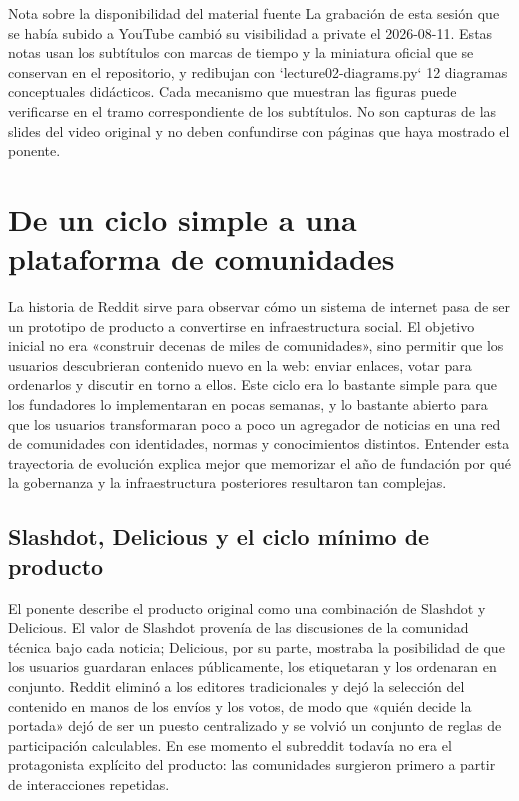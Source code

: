 \documentclass[a4paper]{article}
\begin{document}
\makecscover

\begin{warningbox}{Nota sobre la disponibilidad del material fuente}
La grabación de esta sesión que se había subido a YouTube cambió su visibilidad a private el 2026-08-11. Estas notas usan los subtítulos con marcas de tiempo y la miniatura oficial que se conservan en el repositorio, y redibujan con `lecture02-diagrams.py` 12 diagramas conceptuales didácticos. Cada mecanismo que muestran las figuras puede verificarse en el tramo correspondiente de los subtítulos. No son capturas de las slides del video original y no deben confundirse con páginas que haya mostrado el ponente.
\end{warningbox}

\section{De un ciclo simple a una plataforma de comunidades}

La historia de Reddit sirve para observar cómo un sistema de internet pasa de ser un prototipo de producto a convertirse en infraestructura social. El objetivo inicial no era «construir decenas de miles de comunidades», sino permitir que los usuarios descubrieran contenido nuevo en la web: enviar enlaces, votar para ordenarlos y discutir en torno a ellos. Este ciclo era lo bastante simple para que los fundadores lo implementaran en pocas semanas, y lo bastante abierto para que los usuarios transformaran poco a poco un agregador de noticias en una red de comunidades con identidades, normas y conocimientos distintos. Entender esta trayectoria de evolución explica mejor que memorizar el año de fundación por qué la gobernanza y la infraestructura posteriores resultaron tan complejas.

\subsection{Slashdot, Delicious y el ciclo mínimo de producto}

El ponente describe el producto original como una combinación de Slashdot y Delicious. El valor de Slashdot provenía de las discusiones de la comunidad técnica bajo cada noticia; Delicious, por su parte, mostraba la posibilidad de que los usuarios guardaran enlaces públicamente, los etiquetaran y los ordenaran en conjunto. Reddit eliminó a los editores tradicionales y dejó la selección del contenido en manos de los envíos y los votos, de modo que «quién decide la portada» dejó de ser un puesto centralizado y se volvió un conjunto de reglas de participación calculables. En ese momento el subreddit todavía no era el protagonista explícito del producto: las comunidades surgieron primero a partir de interacciones repetidas.
\end{document}
